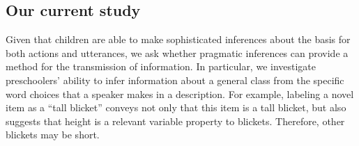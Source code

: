 \documentclass[man]{apa2}
\begin{document}


\subsection{Our current study}

Given that children are able to make sophisticated inferences about the basis for both actions and utterances, we ask whether pragmatic inferences can provide a method for the transmission of information. In particular, we investigate preschoolers' ability to infer information about a general class from the specific word choices that a speaker makes in a description. For example, labeling a novel item as a ``tall blicket'' conveys not only that this item is a tall blicket, but also suggests that height is a relevant variable property to blickets. Therefore, other blickets may be short. 
\end{document}
